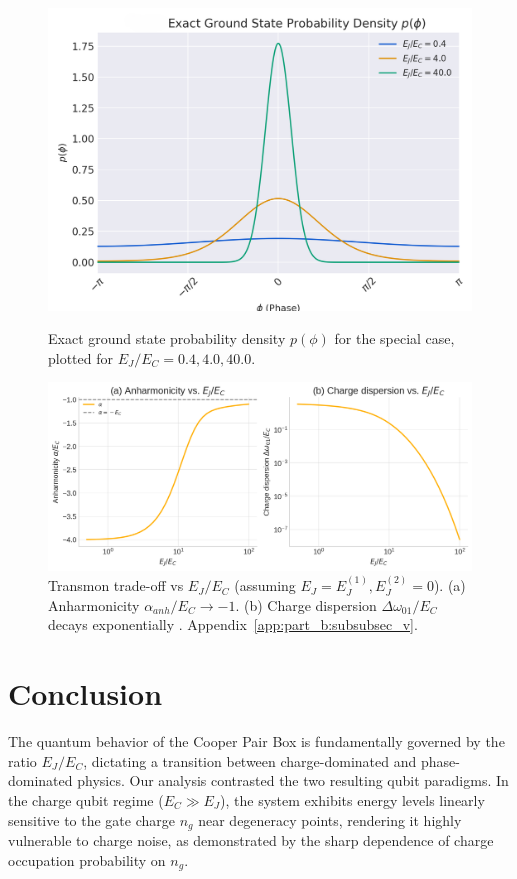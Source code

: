 \documentclass[12pt]{article}
\begin{document}
\begin{figure}[htbp]
  \centering
  \begin{minipage}[t]{0.38\textwidth}
    \centering
    \includegraphics[width=\textwidth]{fig_exact_prob.png}
    \caption{Exact ground state probability density $p(\phi)$ for the special case, plotted for $E_J/E_C = 0.4, 4.0, 40.0$.}
    \label{fig:app_exact_prob}
  \end{minipage}%
  \hfill
  \begin{minipage}[t]{0.6\textwidth}
    \centering
    \includegraphics[width=\textwidth]{fig_anharm_dispersion.png}
    \caption{Transmon trade-off vs $E_J/E_C$ (assuming $E_J=E_J^{(1)}, E_J^{(2)}=0$). (a) Anharmonicity $\alpha_{anh}/E_C \to -1$. (b) Charge dispersion $\Delta\omega_{01}/E_C$ decays exponentially \cite{Koch2007}. Appendix~\ref{app:part_b:subsubsec_v}.}
    \label{fig:main_anharm_dispersion_condensed}
  \end{minipage}
\end{figure}



\section{Conclusion}
The quantum behavior of the Cooper Pair Box is fundamentally governed by the ratio $E_J/E_C$, dictating a transition between charge-dominated and phase-dominated physics. Our analysis contrasted the two resulting qubit paradigms. In the charge qubit regime ($E_C \gg E_J$), the system exhibits energy levels linearly sensitive to the gate charge $n_g$ near degeneracy points, rendering it highly vulnerable to charge noise, as demonstrated by the sharp dependence of charge occupation probability on $n_g$. %
\end{document}
